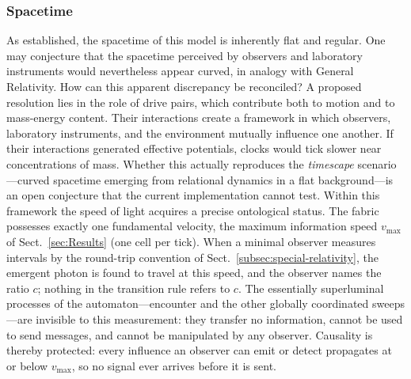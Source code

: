 \documentclass{ijuc}
\begin{document}
\subsubsection{Spacetime}
As established, the spacetime of this model is inherently flat and regular.
One may conjecture that the spacetime perceived by observers and laboratory instruments would nevertheless appear curved, in analogy with General Relativity.
How can this apparent discrepancy be reconciled?
A proposed resolution lies in the role of drive pairs, which contribute both to motion and to mass-energy content.
Their interactions create a framework in which observers, laboratory instruments, and the environment mutually influence one another.
If their interactions generated effective potentials, clocks would tick slower near concentrations of mass.
Whether this actually reproduces the \textit{timescape} scenario \cite{duley2013timescape}---curved spacetime emerging from relational dynamics in a flat background---is an open conjecture that the current implementation cannot test.
Within this framework the speed of light acquires a precise ontological status. The fabric possesses exactly one fundamental velocity, the maximum information speed $v_{\max}$ of Sect.~\ref{sec:Results} (one cell per tick). When a minimal observer measures intervals by the round-trip convention of Sect.~\ref{subsec:special-relativity}, the emergent photon is found to travel at this speed, and the observer names the ratio $c$; nothing in the transition rule refers to $c$. The essentially superluminal processes of the automaton---encounter and the other globally coordinated sweeps---are invisible to this measurement: they transfer no information, cannot be used to send messages, and cannot be manipulated by any observer. Causality is thereby protected: every influence an observer can emit or detect propagates at or below $v_{\max}$, so no signal ever arrives before it is sent.
\end{document}

